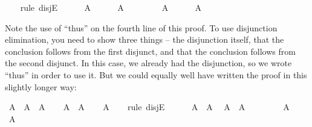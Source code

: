 \begin{isabellebody}
\ \ \isamarkupfalse%
\ {\isacharparenleft}rule\ disjE{\isacharparenright}\isanewline
\ \ \ \ \isamarkupfalse%
\ {\isachardoublequoteopen}A{\isachardoublequoteclose}\isanewline
\ \ \ \ \isamarkupfalse%
\ {\isachardoublequoteopen}A{\isachardoublequoteclose}\isacommand{{\isachardot}}\isamarkupfalse%
\isanewline
\ \ \isamarkupfalse%
\isanewline
\ \ \ \ \isamarkupfalse%
\ {\isachardoublequoteopen}A{\isachardoublequoteclose}\isanewline
\ \ \ \ \isamarkupfalse%
\ {\isachardoublequoteopen}A{\isachardoublequoteclose}\isacommand{{\isachardot}}\isamarkupfalse%
\isanewline
\ \ \isamarkupfalse%
\isanewline
{}\isamarkupfalse%
%
\endisatagproof
{\isafoldproof}%
%
\isadelimproof
%
\endisadelimproof
%
\begin{isamarkuptext}%
Note the use of ``thus'' on the fourth line of this proof. To use disjunction elimination,
you need to show three things -- the disjunction itself, that the conclusion follows from the first
disjunct, and that the conclusion follows from the second disjunct. In this case, we already had the
disjunction, so we wrote ``thus'' in order to use it. But we could equally well have written the
proof in this slightly longer way:%
\end{isamarkuptext}\isamarkuptrue%
\isamarkupfalse%
\ {\isachardoublequoteopen}A\ {\isasymor}\ A\ {\isasymlongrightarrow}\ A{\isachardoublequoteclose}\isanewline
%
\isadelimproof
%
\endisadelimproof
%
\isatagproof
{}\isamarkupfalse%
\isanewline
\ \ \isamarkupfalse%
\ {\isachardoublequoteopen}A\ {\isasymor}\ A{\isachardoublequoteclose}\isanewline
\ \ \isamarkupfalse%
\ {\isachardoublequoteopen}A{\isachardoublequoteclose}\isanewline
\ \ \isamarkupfalse%
\ {\isacharparenleft}rule\ disjE{\isacharparenright}\isanewline
\ \ \ \ \isamarkupfalse%
\ {\isachardoublequoteopen}A\ {\isasymor}\ A{\isachardoublequoteclose}\ \isamarkupfalse%
\ {\isacharbackquoteopen}A\ {\isasymor}\ A{\isacharbackquoteclose}\isacommand{{\isachardot}}\isamarkupfalse%
\isanewline
\ \ \isamarkupfalse%
\isanewline
\ \ \ \ \isamarkupfalse%
\ {\isachardoublequoteopen}A{\isachardoublequoteclose}\isanewline
\ \ \ \ \isamarkupfalse%
\ {\isachardoublequoteopen}A{\isachardoublequoteclose}\isacommand{{\isachardot}}\isamarkupfalse%
\isanewline
\ \ \isamarkupfalse%
\isanewline
\ \ \ \ \isamarkupfalse%

\end{isabellebody}
